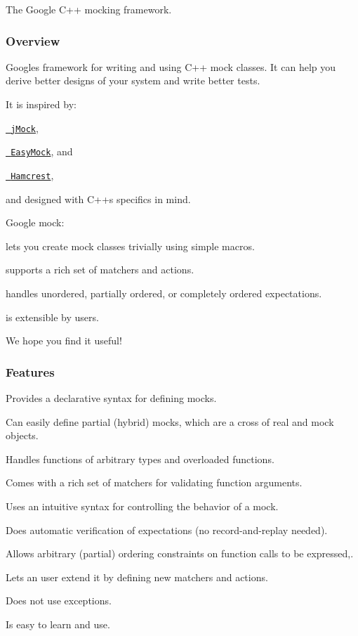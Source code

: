 The Google C++ mocking framework.

\subsubsection*{Overview}

Google\textquotesingle{}s framework for writing and using C++ mock classes. It can help you derive better designs of your system and write better tests.

It is inspired by\+:


\begin{DoxyItemize}
\item \href{http://www.jmock.org/}{\texttt{ j\+Mock}},
\item \href{http://www.easymock.org/}{\texttt{ Easy\+Mock}}, and
\item \href{http://code.google.com/p/hamcrest/}{\texttt{ Hamcrest}},
\end{DoxyItemize}

and designed with C++\textquotesingle{}s specifics in mind.

Google mock\+:


\begin{DoxyItemize}
\item lets you create mock classes trivially using simple macros.
\item supports a rich set of matchers and actions.
\item handles unordered, partially ordered, or completely ordered expectations.
\item is extensible by users.
\end{DoxyItemize}

We hope you find it useful!

\subsubsection*{Features}


\begin{DoxyItemize}
\item Provides a declarative syntax for defining mocks.
\item Can easily define partial (hybrid) mocks, which are a cross of real and mock objects.
\item Handles functions of arbitrary types and overloaded functions.
\item Comes with a rich set of matchers for validating function arguments.
\item Uses an intuitive syntax for controlling the behavior of a mock.
\item Does automatic verification of expectations (no record-\/and-\/replay needed).
\item Allows arbitrary (partial) ordering constraints on function calls to be expressed,.
\item Lets an user extend it by defining new matchers and actions.
\item Does not use exceptions.
\item Is easy to learn and use.
\end{DoxyItemize}

